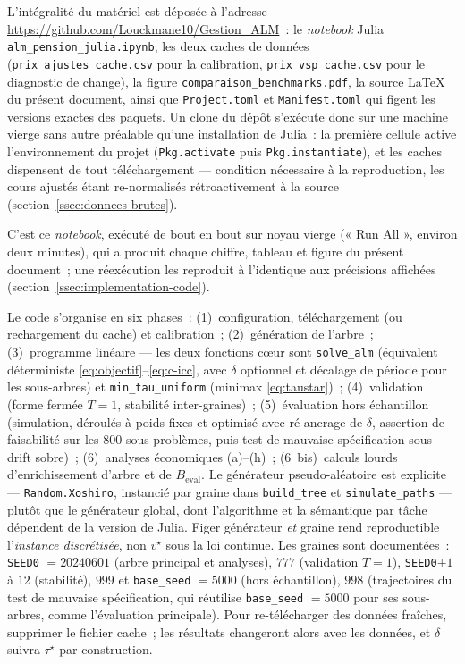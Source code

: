 \documentclass[11pt,letterpaper]{article}
\newcommand{\taustar}{\tau^{\star}}
\theoremstyle{definition}
\begin{document}
\begin{sloppypar}
L'intégralité du matériel est déposée à l'adresse
\url{https://github.com/Louckmane10/Gestion_ALM}~: le \emph{notebook} Julia
\texttt{alm\_pension\_julia.ipynb}, les deux caches de données
(\texttt{prix\_ajustes\_cache.csv} pour la calibration,
\texttt{prix\_vsp\_cache.csv} pour le diagnostic de change), la figure
\texttt{comparaison\_benchmarks.pdf}, la source \LaTeX{} du présent document,
ainsi que \texttt{Project.toml} et \texttt{Manifest.toml} qui figent les
versions exactes des paquets. Un clone du dépôt s'exécute donc sur une machine
vierge sans autre préalable qu'une installation de Julia~: la première cellule
active l'environnement du projet (\texttt{Pkg.activate} puis
\texttt{Pkg.instantiate}), et les caches dispensent de tout téléchargement ---
condition nécessaire à la reproduction, les cours ajustés étant re-normalisés
rétroactivement à la source (section~\ref{ssec:donnees-brutes}).
\end{sloppypar}
\begin{sloppypar} C'est ce \emph{notebook}, exécuté de
bout en bout sur noyau vierge (« Run All », environ deux minutes), qui a
produit chaque chiffre, tableau et figure du présent document~; une
réexécution les reproduit à l'identique aux précisions affichées
(section~\ref{ssec:implementation-code}).
\end{sloppypar}

Le code s'organise en six phases~: (1)~configuration, téléchargement (ou
rechargement du cache) et calibration~; (2)~génération de l'arbre~;
(3)~programme linéaire --- les deux fonctions c\oe ur sont
\texttt{solve\_alm} (équivalent déterministe
\eqref{eq:objectif}--\eqref{eq:c-icc}, avec $\delta$ optionnel et décalage de
période pour les sous-arbres) et \texttt{min\_tau\_uniform} (minimax
\eqref{eq:taustar})~; (4)~validation (forme fermée $T=1$, stabilité
inter-graines)~; (5)~évaluation hors échantillon (simulation, déroulés à poids
fixes et optimisé avec ré-ancrage de $\delta$, assertion de faisabilité sur
les $800$ sous-problèmes, puis test de mauvaise spécification sous drift
sobre)~; (6)~analyses économiques (a)--(h)~; (6~bis)~calculs lourds d'enrichissement
d'arbre et de $B_{\mathrm{eval}}$. Le générateur pseudo-aléatoire est explicite
--- \texttt{Random.Xoshiro}, instancié par graine dans \texttt{build\_tree} et
\texttt{simulate\_paths} --- plutôt que le générateur global, dont l'algorithme
et la sémantique par tâche dépendent de la version de Julia. Figer générateur
\emph{et} graine rend reproductible l'\emph{instance discrétisée}, non
$v^\star$ sous la loi continue. Les graines sont documentées~: \texttt{SEED0} $= 20240601$ (arbre principal et
analyses), $777$ (validation $T=1$), \texttt{SEED0}$+1$ à $12$ (stabilité),
$999$ et \texttt{base\_seed} $= 5000$ (hors échantillon), $998$ (trajectoires
du test de mauvaise spécification, qui réutilise \texttt{base\_seed} $= 5000$
pour ses sous-arbres, comme l'évaluation principale). Pour re-télécharger
des données fraîches, supprimer le fichier cache~; les résultats changeront
alors avec les données, et $\delta$ suivra $\taustar$ par construction.
\end{document}
